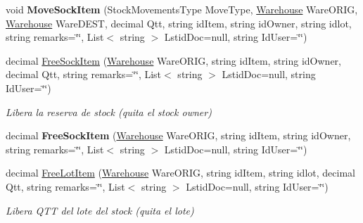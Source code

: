 \begin{DoxyCompactItemize}
\mbox{\label{class_h_k_supply_1_1_p_r_j___stocks_1_1_classes_1_1_stocks_a7ef7e411726bffb2660b88c9d00df4d8}} 
void {\bfseries Move\+Sock\+Item} (Stock\+Movements\+Type Move\+Type, \mbox{\hyperlink{class_h_k_supply_1_1_p_r_j___stocks_1_1_classes_1_1_stocks_1_1_warehouse}{Warehouse}} Ware\+O\+R\+IG, \mbox{\hyperlink{class_h_k_supply_1_1_p_r_j___stocks_1_1_classes_1_1_stocks_1_1_warehouse}{Warehouse}} Ware\+D\+E\+ST, decimal Qtt, string id\+Item, string id\+Owner, string idlot, string remarks=\char`\"{}\char`\"{}, List$<$ string $>$ Lstid\+Doc=null, string Id\+User=\char`\"{}\char`\"{})
\item 
decimal \mbox{\hyperlink{class_h_k_supply_1_1_p_r_j___stocks_1_1_classes_1_1_stocks_aee55b8b123dc0495548917a36ebb35fa}{Free\+Sock\+Item}} (\mbox{\hyperlink{class_h_k_supply_1_1_p_r_j___stocks_1_1_classes_1_1_stocks_1_1_warehouse}{Warehouse}} Ware\+O\+R\+IG, string id\+Item, string id\+Owner, decimal Qtt, string remarks=\char`\"{}\char`\"{}, List$<$ string $>$ Lstid\+Doc=null, string Id\+User=\char`\"{}\char`\"{})
\begin{DoxyCompactList}\small\item\em Libera la reserva de stock (quita el stock owner) \end{DoxyCompactList}\item 
\mbox{\label{class_h_k_supply_1_1_p_r_j___stocks_1_1_classes_1_1_stocks_aa420a8612b2de086fdf1529a709d9b5f}} 
decimal {\bfseries Free\+Sock\+Item} (\mbox{\hyperlink{class_h_k_supply_1_1_p_r_j___stocks_1_1_classes_1_1_stocks_1_1_warehouse}{Warehouse}} Ware\+O\+R\+IG, string id\+Item, string id\+Owner, string remarks=\char`\"{}\char`\"{}, List$<$ string $>$ Lstid\+Doc=null, string Id\+User=\char`\"{}\char`\"{})
\item 
decimal \mbox{\hyperlink{class_h_k_supply_1_1_p_r_j___stocks_1_1_classes_1_1_stocks_a2055a94e7ade97891e36fd0a8c930378}{Free\+Lot\+Item}} (\mbox{\hyperlink{class_h_k_supply_1_1_p_r_j___stocks_1_1_classes_1_1_stocks_1_1_warehouse}{Warehouse}} Ware\+O\+R\+IG, string id\+Item, string idlot, decimal Qtt, string remarks=\char`\"{}\char`\"{}, List$<$ string $>$ Lstid\+Doc=null, string Id\+User=\char`\"{}\char`\"{})
\begin{DoxyCompactList}\small\item\em Libera Q\+TT del lote del stock (quita el lote) \end{DoxyCompactList}\item 

\end{DoxyCompactItemize}
